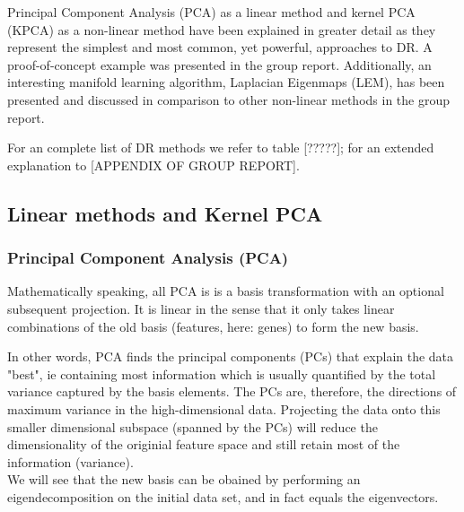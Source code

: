 \documentclass[journal, a4paper]{IEEEtran}
\begin{document}
Principal Component Analysis (PCA) as a linear method and kernel PCA (KPCA) as a non-linear method have been explained in greater detail as they represent the simplest and most common, yet powerful, approaches to DR. A proof-of-concept example was presented in the group report.
Additionally, an interesting manifold learning algorithm, Laplacian Eigenmaps (LEM), has been presented and discussed in comparison to other non-linear methods in the group report.

For an complete list of DR methods we refer to table [?????]; for an extended explanation to [APPENDIX OF GROUP REPORT].




\subsection{Linear methods and Kernel PCA}

\subsubsection{Principal Component Analysis (PCA)}


Mathematically speaking, all PCA is is a basis transformation with an optional subsequent projection. It is linear in the sense that it only takes linear combinations of the old basis (features, here: genes) to form the new basis. 

In other words, PCA finds the principal components (PCs) that explain the data "best", ie containing most information which is usually quantified by the total variance captured by the basis elements. The PCs are, therefore, the directions of maximum variance in the high-dimensional data. Projecting the data onto this smaller dimensional subspace (spanned by the PCs) will reduce the dimensionality of the originial feature space and still retain most of the information (variance). \\
We will see that the new basis can be obained by performing an eigendecomposition on the initial data set, and in fact equals the eigenvectors.
\end{document}

